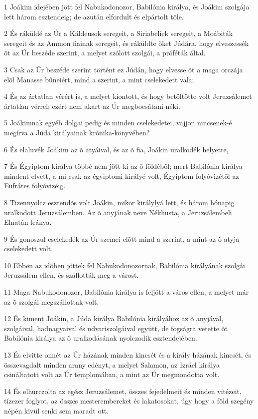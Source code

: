 \par 1 Joákim idejében jött fel Nabukodonozor, Babilónia királya, és Joákim szolgája lett három esztendeig; de azután elfordult és elpártolt tõle.
\par 2 És ráküldé az Úr a Káldeusok seregeit, a Siriabeliek seregeit, a Moábiták seregeit és az Ammon fiainak seregeit, és ráküldte õket Júdára, hogy elveszessék õt az Úr beszéde szerint, a melyet szólott szolgái, a próféták által.
\par 3 Csak az Úr beszéde szerint történt ez Júdán, hogy elvesse õt a maga orczája elõl Manasse bûneiért, mind a szerint, a mint cselekedett vala;
\par 4 És az ártatlan vérért is, a melyet kiontott, és hogy betöltötte volt Jeruzsálemet ártatlan vérrel; ezért nem akart az Úr megbocsátani néki.
\par 5 Joákimnak egyéb dolgai pedig és minden cselekedetei, vajjon nincsenek-é megírva a Júda királyainak krónika-könyvében?
\par 6 És elaluvék Joákim az õ atyáival, és az õ fia, Joákin uralkodék helyette,
\par 7 És Égyiptom királya többé nem jött ki az õ földébõl; mert Babilónia királya mindent elvett, a mi csak az égyiptomi királyé volt, Égyiptom folyóvizétõl az Eufrátes folyóvizéig.
\par 8 Tizennyolcz esztendõs volt Joákin, mikor királylyá lett, és három hónapig uralkodott Jeruzsálemben. Az õ anyjának neve Nékhusta, a Jeruzsálembeli Elnatán leánya.
\par 9 És gonoszul cselekedék az Úr szemei elõtt mind a szerint, a mint az õ atyja cselekedett volt.
\par 10 Ebben az idõben jöttek fel Nabukodonozornak, Babilónia királyának szolgái Jeruzsálem ellen, és szállották meg a várost.
\par 11 Maga Nabukodonozor, Babilónia királya is feljött a város ellen, a melyet már az õ szolgái megszállottak volt.
\par 12 És kiment Joákin, a Júda királya Babilónia királyához az õ anyjával, szolgáival, hadnagyaival és udvariszolgáival együtt, de fogságra vetette õt Babilónia királya az õ uralkodásának nyolczadik esztendejében.
\par 13 És elvitte onnét az Úr házának minden kincsét és a király házának kincsét, és összevagdalt minden arany edényt, a melyet Salamon, az Izráel királya csináltatott volt az Úr templomában, a mint az Úr megmondotta volt.
\par 14 És elhurczolta az egész Jeruzsálemet, összes fejedelmeit és minden vitézeit, tízezer foglyot, az összes mesterembereket és lakatosokat, úgy hogy a föld szegény népén kivül senki sem maradt ott.
